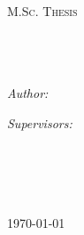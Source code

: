 \documentclass[11pt, oneside]{Thesis} %
\begin{document}
\begin{titlepage}
\begin{center}

\textsc{\LARGE \univname}\\[1.5cm] %
\textsc{\Large M.Sc. Thesis}\\[0.5cm] %

\HRule \\[0.4cm] %
{\huge \bfseries \ttitle}\\[0.4cm] %
\HRule \\[1.5cm] %
 
\begin{minipage}{0.4\textwidth}
\begin{flushleft} \large
\emph{Author:}\\
\href{http://student.dei.uc.pt/~valenca}{\authornames} %
\end{flushleft}
\end{minipage}
\begin{minipage}{0.4\textwidth}
\begin{flushright} \large
\emph{Supervisors:} \\
\href{https://eden.dei.uc.pt/~paquete}{\supname} %
\end{flushright}
\end{minipage}\\[3cm]
 
\large \textit{}\\[0.3cm] %
\textit{}\\[0.4cm]
\deptname\\[2cm] %
 
{\large \today}\\[4cm] %
 
\vfill
\end{center}

\end{titlepage}



\clearpage %
\end{document}
